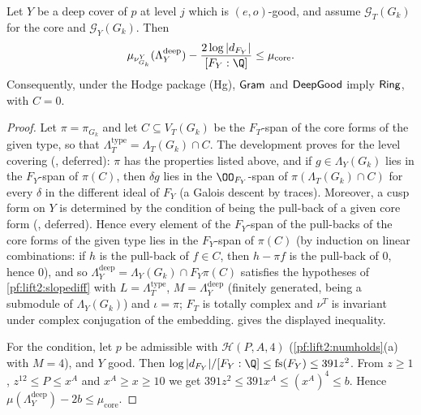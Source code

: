 \begin{proposition}\label{pf:lift2:ring}
Let $Y$ be a deep cover of $p$ at level $j$ which is $(e,o)$-good, and assume $\mathcal G_T(G_k)$ for the core and
$\mathcal G_Y(G_k)$. Then
\[
\mu_{\nu^Y_{G_k}}(\Lambda^{\mathrm{deep}}_Y)-\frac{2\log|d_{F_Y}|}{[F_Y:\Q]}\le\mu_{\mathrm{core}}.
\]
Consequently, under the Hodge package \textup{(Hg)}, $\mathsf{Gram}$ and $\mathsf{DeepGood}$ imply $\mathsf{Ring}$, with
$C=0$.
\end{proposition}

\begin{proof}
Let $\pi=\pi_{G_k}$ and let $C\subseteq V_T(G_k)$ be the $F_T$-span of the core forms of the given type, so that
$\Lambda^{\mathrm{type}}_T=\Lambda_T(G_k)\cap C$. The development proves for the level covering
(, deferred): $\pi$ has the properties
listed above, and if $g\in\Lambda_Y(G_k)$ lies in the $F_Y$-span of $\pi(C)$, then $\delta g$ lies in the
$\OO_{F_Y}$-span of $\pi(\Lambda_T(G_k)\cap C)$ for every $\delta$ in the different ideal of $F_Y$ (a Galois descent
by traces). Moreover, a cusp form on $Y$ is determined by the condition of being the pull-back of a given core form
(, deferred). Hence every element of the
$F_Y$-span of the pull-backs of the core forms of the given type lies in the $F_Y$-span of $\pi(C)$ (by induction on
linear combinations: if $h$ is the pull-back of $f\in C$, then $h-\pi f$ is the pull-back of $0$, hence $0$), and
so $\Lambda^{\mathrm{deep}}_Y=\Lambda_Y(G_k)\cap F_Y\pi(C)$ satisfies the hypotheses of \cref{pf:lift2:slopediff} with
$L=\Lambda^{\mathrm{type}}_T$, $M=\Lambda^{\mathrm{deep}}_Y$ (finitely generated, being a submodule of
$\Lambda_Y(G_k)$) and $\iota=\pi$; $F_T$ is totally complex and $\nu^T$ is invariant under complex conjugation of the
embedding.  gives the displayed inequality.

For the condition, let $p$ be admissible with $\mathcal H(P,A,4)$ (\cref{pf:lift2:numholds}(a) with $M=4$),
and $Y$ good. Then $\log|d_{F_Y}|/[F_Y:\Q]\le\mathrm{fs}(F_Y)\le391z^2$. From $z\ge1$, $z^{12}\le P\le x^A$ and
$x^A\ge x\ge10$ we get $391z^2\le391x^A\le(x^A)^4\le b$. Hence $\mu(\Lambda^{\mathrm{deep}}_Y)-2b\le\mu_{\mathrm{core}}$.
\end{proof}

